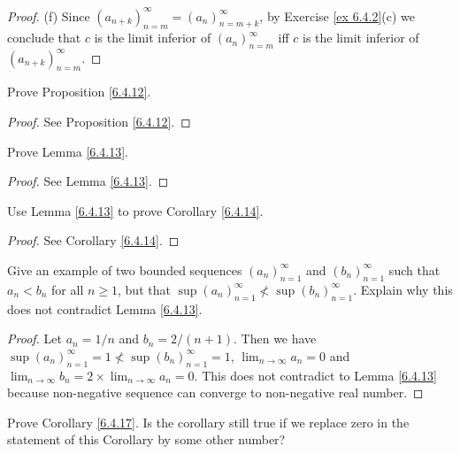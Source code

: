 \begin{proof}{(f)}
    Since \((a_{n + k})_{n = m}^\infty = (a_n)_{n = m + k}^\infty\), by Exercise \ref{ex 6.4.2}(c) we conclude that \(c\) is the limit inferior of \((a_n)_{n = m}^\infty\) iff \(c\) is the limit inferior of \((a_{n + k})_{n = m}^\infty\).
\end{proof}

\begin{exercise}\label{ex 6.4.3}
    Prove Proposition \ref{6.4.12}.
\end{exercise}

\begin{proof}
    See Proposition \ref{6.4.12}.
\end{proof}

\begin{exercise}\label{ex 6.4.4}
    Prove Lemma \ref{6.4.13}.
\end{exercise}

\begin{proof}
    See Lemma \ref{6.4.13}.
\end{proof}

\begin{exercise}\label{ex 6.4.5}
    Use Lemma \ref{6.4.13} to prove Corollary \ref{6.4.14}.
\end{exercise}

\begin{proof}
    See Corollary \ref{6.4.14}.
\end{proof}

\begin{exercise}\label{ex 6.4.6}
    Give an example of two bounded sequences \((a_n)_{n = 1}^\infty\) and \((b_n)_{n = 1}^\infty\) such that \(a_n < b_n\) for all \(n \geq 1\), but that \(\sup(a_n)_{n = 1}^\infty \not< \sup(b_n)_{n = 1}^\infty\).
    Explain why this does not contradict Lemma \ref{6.4.13}.
\end{exercise}

\begin{proof}
    Let \(a_n = 1 / n\) and \(b_n = 2 / (n + 1)\).
    Then we have \(\sup(a_n)_{n = 1}^\infty = 1 \not < \sup(b_n)_{n = 1}^\infty = 1\), \(\lim_{n \to \infty} a_n = 0\) and \(\lim_{n \to \infty} b_n = 2 \times \lim_{n \to \infty} a_n = 0\).
    This does not contradict to Lemma \ref{6.4.13} because non-negative sequence can converge to non-negative real number.
\end{proof}

\begin{exercise}\label{ex 6.4.7}
    Prove Corollary \ref{6.4.17}.
    Is the corollary still true if we replace zero in the statement of this Corollary by some other number?
\end{exercise}

